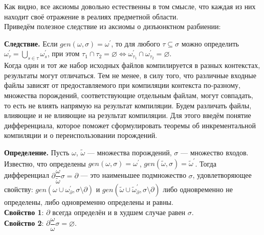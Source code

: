 Как видно, все аксиомы довольно естественны в том смысле, что каждая из них находит своё отражение в реалиях предметной области.\\

Приведём полезное следствие из аксиомы о дизъюнктном разбиении:

\textbf{Следствие.}
Если $gen(\omega, \sigma) = \omega^\prime$, то для любого $\tau \subseteq \sigma$ можно определить $\omega^\prime_\tau = \bigcup\limits_{s\in\tau}\omega^\prime_s$, при этом $\tau_1 \cap \tau_2 = \varnothing \Leftrightarrow \omega^\prime_{\tau_1} \cap \omega^\prime_{\tau_2} = \varnothing$.\\


Когда один и тот же набор исходных файлов компилируется в разных контекстах, результаты могут отличаться. Тем не менее, в силу того, что различные входные файлы зависят от предоставляемого при компиляции контекста по-разному, множества порождений, соответствующие отдельным файлам, могут совпадать, то есть не влиять напрямую на результат компиляции. Будем различать файлы, влияющие и не влияющие на результат компиляции. Для этого введём понятие дифференциала, которое поможет сформулировать теоремы об инкрементальной компиляции и о переиспользовании порождений.

\textbf{Определение.} Пусть $\omega$, $\tilde{\omega}$ --- множества порождений, $\sigma$ --- множество входов. Известно, что определены $gen(\omega, \sigma) = \omega^\prime$, $gen(\tilde{\omega}, \sigma) = \tilde{\omega}^\prime$. Тогда дифференциал $\partial\dfrac{\omega}{\tilde{\omega}}\sigma = \partial$ --- это наименьшее подмножество $\sigma$, удовлетворяющее свойству: 
$gen(\omega \cup \omega^\prime_{\partial}, \sigma\setminus\partial)$ и
$gen(\tilde{\omega} \cup \tilde{\omega}^\prime_{\partial}, \sigma\setminus\partial)$ либо одновременно не определены, либо одновременно определены и равны.\\

\textbf{Свойство 1}: $\partial$ всегда определён и в худшем случае равен $\sigma$.\\

\textbf{Свойство 2}: $\partial\dfrac{\omega}{\omega}\sigma = \varnothing$.\\

\begin{comment}
	Вопрос: верно ли, что в условиях инкрементального случая (там, где $\Delta^\rho_\alpha\sigma$)

	$$\partial\dfrac{\omega_\rho}{\omega_\alpha}(\sigma\setminus\rho)\subseteq\xi$$ ?

	\textbf{Доказательство:}

	\newcommand{\mypart}{\partial\dfrac{\omega_\rho}{\omega_\alpha}(\sigma\setminus\rho)}

	Докажем, что если $s \in \sigma\setminus\rho$, $s \notin \xi$, то $s \notin \mypart$. Обозначим $\tau = (\sigma\setminus\rho)\setminus\mypart$, тогда $\tau$ --- наибольшее подмножество $\sigma\setminus\rho$, такое, что $gen(\omega_\rho, \tau)$ определено $\Leftrightarrow$ $gen(\omega_\alpha, \tau)$ определено. Предположим, $s \in \mypart$, тогда $s \notin \tau$. Рассмотрим $gen(\omega_\rho, \tau)$.
\end{comment}

